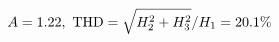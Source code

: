 \documentclass[preview]{standalone}
\begin{document}
\begin{align*}
\special{dvisvgm:raw <g id='unique000'>}A=1.22,\ \text{THD}=\sqrt{H_2^2+H_3^2}/H_1=20.1\%\special{dvisvgm:raw </g>}
\end{align*}
\end{document}
